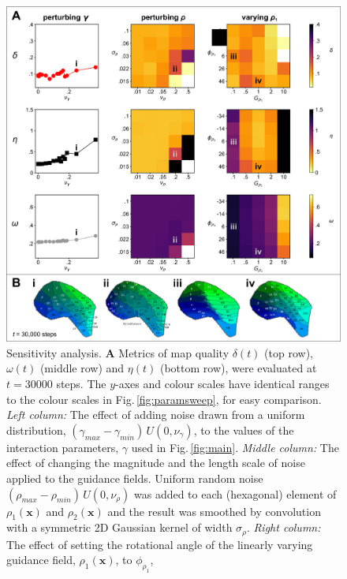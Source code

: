 \documentclass[9pt,lineno]{elife}
\newcommand{\MPthreeSens}[1]{\textcolor{colmpthreesens}{#1}}
\newcommand{\mb}[1]{\mathbf{#1}}
\begin{document}
\begin{figure}
  \begin{fullwidth}
    \includegraphics[width=\linewidth]{./Fig3.png}
    \caption{
      \MPthreeSens{Sensitivity analysis.
        \textbf{A} Metrics of map quality $\delta(t)$ (top row), $\omega(t)$
        (middle row) and $\eta(t)$ (bottom row), were evaluated at $t=30000$
        steps. The $y$-axes and colour scales have identical ranges to the
        colour scales in Fig.\,\ref{fig:paramsweep}, for easy comparison.
        \emph{Left column:} The effect of adding noise drawn from a uniform
        distribution, $(\gamma_{max}-\gamma_{min})\,U(0,\nu_\gamma)$, to the
        values of the interaction parameters, $\gamma$ used in
        Fig.\,\ref{fig:main}.
        \emph{Middle column:} The effect of changing the magnitude and the
        length scale of noise applied to the guidance fields. Uniform random
        noise $(\rho_{max} - \rho_{min})\,U(0, \nu_{\rho})$ was added to each
        (hexagonal) element of $\rho_1(\mb{x})$ and $\rho_2(\mb{x})$ and the
        result was smoothed by convolution with a symmetric 2D Gaussian kernel
        of width $\sigma_\rho$.
        \emph{Right column:} The effect of setting the rotational angle of the
        linearly varying guidance field, $\rho_1(\mb{x})$, to $\phi_{\rho_1}$,
}}
\end{fullwidth}
\end{figure}
\end{document}
